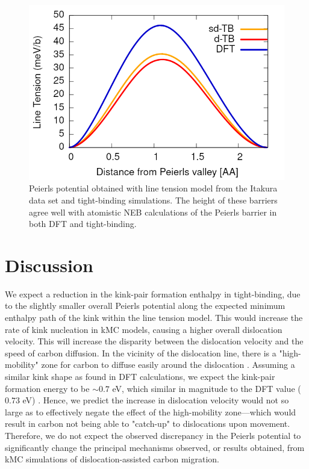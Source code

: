 \documentclass[a4paper,11pt]{article}
\begin{document}
\begin{figure}[htbp]
\centering
\includegraphics[width=.9\linewidth]{Images/fe_peierls_potential_pure.png}
\caption{Peierls potential obtained with line tension model from the Itakura data set and tight-binding simulations. The height of these barriers agree well with atomistic NEB calculations of the Peierls barrier in both DFT and tight-binding.}
\end{figure}




\section{Discussion}
\label{sec:org56e7298}
\label{sec:discussion}


We expect a reduction in the kink-pair formation enthalpy in tight-binding, due to
the slightly smaller overall Peierls potential along the expected minimum enthalpy
path of the kink within the line tension model. This would increase
the rate of kink nucleation in kMC models, causing a higher overall dislocation
velocity. This will increase the disparity between the dislocation velocity and
the speed of carbon diffusion. In the vicinity of the dislocation line, there is a
"high-mobility" zone for carbon to diffuse easily around the dislocation
\cite{Nematollahi2016}. Assuming a similar kink shape as found in DFT calculations,
we expect the kink-pair formation energy to be \(\sim 0.7\) eV, which similar in
magnitude to the DFT value (\(0.73\) eV) \cite{Itakura2012}. Hence, we predict the
increase in dislocation velocity would not so large as to effectively negate the
effect of the high-mobility zone---which would result in carbon not being able to
"catch-up" to dislocations upon movement. Therefore, we do not expect the observed
discrepancy in the Peierls potential to significantly change the principal
mechanisms observed, or results obtained, from kMC simulations of
dislocation-assisted carbon migration.
\end{document}
